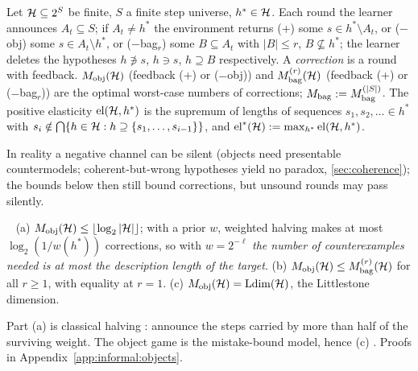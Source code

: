 \begin{definition}\label{def:informal:game}
Let $\mathcal{H}\subseteq2^S$ be finite, $S$ a finite step universe, $h^*\in\mathcal{H}$. Each round the learner announces $A_t\subseteq S$; if $A_t\ne h^*$ the environment returns (+) some $s\in h^*\setminus A_t$, or (\(-\)obj) some $s\in A_t\setminus h^*$, or (\(-\)bag$_r$) some $B\subseteq A_t$ with $|B|\le r$, $B\not\subseteq h^*$; the learner deletes the hypotheses $h\not\ni s$, $h\ni s$, $h\supseteq B$ respectively. A \emph{correction} is a round with feedback. $M_{\mathrm{obj}}(\mathcal{H})$ (feedback (+) or (\(-\)obj)) and $M^{(r)}_{\mathrm{bag}}(\mathcal{H})$ (feedback (+) or (\(-\)bag$_r$)) are the optimal worst-case numbers of corrections; $M_{\mathrm{bag}}:=M^{(|S|)}_{\mathrm{bag}}$. The positive elasticity $\mathrm{el}(\mathcal{H},h^*)$ is the supremum of lengths of sequences $s_1,s_2,\ldots\in h^*$ with $s_i\notin\bigcap\{h\in\mathcal{H}:h\supseteq\{s_1,\dots,s_{i-1}\}\}$, and $\mathrm{el}^*(\mathcal{H}):=\max_{h^*}\mathrm{el}(\mathcal{H},h^*)$.
\end{definition}

In reality a negative channel can be silent (objects need presentable countermodels; coherent-but-wrong hypotheses yield no paradox, \cref{sec:coherence}); the bounds below then still bound corrections, but unsound rounds may pass silently.

\begin{theorem}\ \label{thm:informal:objects}
(a) $M_{\mathrm{obj}}(\mathcal{H})\le\lfloor\log_2|\mathcal{H}|\rfloor$; with a prior $w$, weighted halving makes at most $\log_2(1/w(h^*))$ corrections, so with $w=2^{-\ell}$ \emph{the number of counterexamples needed is at most the description length of the target}. (b) $M_{\mathrm{obj}}(\mathcal{H})\le M^{(r)}_{\mathrm{bag}}(\mathcal{H})$ for all $r\ge1$, with equality at $r=1$. (c) $M_{\mathrm{obj}}(\mathcal{H})=\mathrm{Ldim}(\mathcal{H})$, the Littlestone dimension. \hfill{}
\end{theorem}

Part (a) is classical halving \citep{barzdin1972prediction,littlestone1988learning,angluin1988queries}: announce the steps carried by more than half of the surviving weight. The object game is the mistake-bound model, hence (c) \citep{littlestone1988learning}. Proofs in Appendix~\ref{app:informal:objects}.


